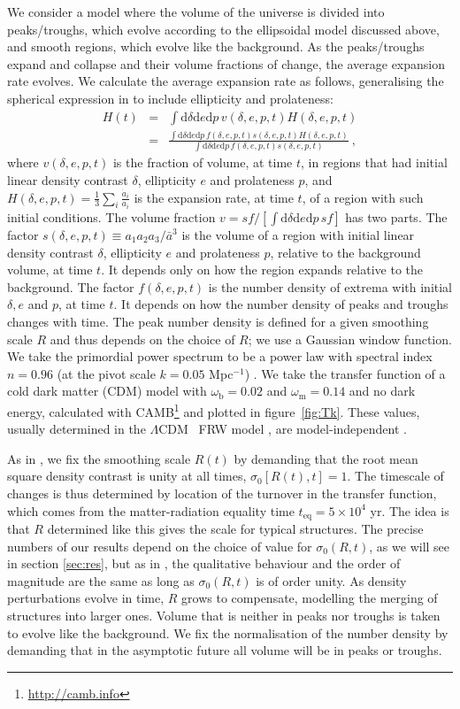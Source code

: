 \documentclass[11pt, a4paper]{article}
\newcommand{\bea}{\begin{eqnarray}} \newcommand{\eea}{\end{eqnarray}}
\newcommand{\el}{\nonumber \\}
\renewcommand{\sec}[1]{section \ref{#1}}
\renewcommand{\d}{\delta}
\newcommand{\LCDM}{$\Lambda$CDM\ }
\newcommand{\teq}{t_{\mathrm{eq}}}
\newcommand{\rmd}{\mathrm{d}}
\newcommand{\adot}{\dot{a}}
\newcommand{\om}{\omega_{\mathrm{m}}}
\newcommand{\ob}{\omega_{\mathrm{b}}}
\begin{document}
We consider a model where the volume of the universe is divided into peaks/troughs, which evolve according to the ellipsoidal model discussed above, and smooth regions, which evolve like the background. As the peaks/troughs expand and collapse and their volume fractions of change, the average expansion rate evolves. We calculate the average expansion rate as follows, generalising the spherical expression in \cite{Rasanen:2008it} to include ellipticity and prolateness:
\bea \label{statH}
  H(t) &=& \int\rmd\d\rmd e\rmd p \, v(\d,e,p,t) H(\d,e,p,t) \el
  &=& \frac{ \int\rmd\d\rmd e\rmd p \, f(\d,e,p,t) s(\d,e,p,t) H(\d,e,p,t) }{  \int\rmd\d\rmd e\rmd p \, f(\d,e,p,t) s(\d,e,p,t)} \ ,
\eea
%
where $v(\d,e,p,t)$ is the fraction of volume, at time $t$, in regions
that had initial linear density contrast $\d$, ellipticity $e$ and
prolateness $p$, and
$H(\d,e,p,t)=\frac{1}{3}\sum_i\frac{\adot_i}{a_i}$ is the expansion
rate, at time $t$, of a region with such initial conditions. The
volume fraction $v=s f/[\int\rmd\d\rmd e\rmd p \, s f]$ has two
parts. The factor $s(\d,e,p,t)\equiv a_1 a_2 a_3/{\bar a}^3$ is the
volume of a region with initial linear density contrast $\d$,
ellipticity $e$ and prolateness $p$, relative to the background
volume, at time $t$. It depends only on how the region expands
relative to the background.  The factor $f(\d,e,p,t)$ is the number
density of extrema with initial $\d,e$ and $p$, at time $t$. It
depends on how the number density of peaks and troughs changes with
time. The peak number density is defined for a given smoothing scale $R$ and thus depends on the choice of $R$; we use a Gaussian window function. We take the primordial power spectrum
to be a power law with spectral index $n=0.96$ (at the pivot scale $k=0.05$
Mpc$^{-1}$) \cite{Ade:2015xua}. We take the transfer function of a
cold dark matter (CDM) model with $\ob=0.02$ and $\om=0.14$ and no
dark energy, calculated with CAMB\footnote{\url{http://camb.info}} \cite{Lewis:1999bs} and plotted in
figure~\ref{fig:Tk}. These values, usually determined in the \LCDM
FRW model \cite{Ade:2015xua}, are model-independent
\cite{Vonlanthen:2010cd, *Audren:2012wb, *Audren:2013nwa}.

As in \cite{Rasanen:2008it}, we fix the smoothing scale $R(t)$ by demanding that the root mean square density contrast is unity at all times, $\sigma_0[R(t),t]=1$. The timescale of changes is thus determined by location of the turnover in the transfer function, which comes from the matter-radiation equality time $\teq=5\times10^4$ yr.
The idea is that $R$ determined like this gives the scale for typical structures. The precise numbers of our results depend on the choice of value for $\sigma_0(R,t)$, as we will see in \sec{sec:res}, but as in \cite{Rasanen:2008it}, the qualitative behaviour and the order of magnitude are the same as long as $\sigma_0(R,t)$ is of order unity. As density perturbations evolve in time, $R$ grows to compensate, modelling the merging of structures into larger ones. Volume that is neither in peaks nor troughs is taken to evolve like the background. We fix the normalisation of the number density by demanding that in the asymptotic future all volume will be in peaks or troughs.
\end{document}
